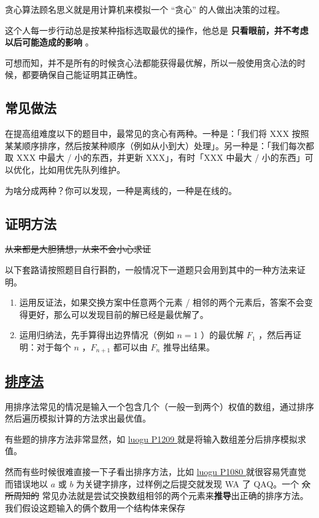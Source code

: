 
贪心算法顾名思义就是用计算机来模拟一个 “贪心” 的人做出决策的过程。

这个人每一步行动总是按某种指标选取最优的操作，他总是 \textbf{ 只看眼前，并不考虑以后可能造成的影响 } 。

可想而知，并不是所有的时候贪心法都能获得最优解，所以一般使用贪心法的时候，都要确保自己能证明其正确性。

\subsection{常见做法}

在提高组难度以下的题目中，最常见的贪心有两种。一种是：「我们将 XXX 按照某某顺序排序，然后按某种顺序（例如从小到大）处理」。另一种是：「我们每次都取 XXX 中最大 / 小的东西，并更新 XXX」，有时「XXX 中最大 / 小的东西」可以优化，比如用优先队列维护。

为啥分成两种？你可以发现，一种是离线的，一种是在线的。

\subsection{证明方法}

\sout{从来都是大胆猜想，从来不会小心求证}

以下套路请按照题目自行斟酌，一般情况下一道题只会用到其中的一种方法来证明。

\begin{enumerate}
\item 运用反证法，如果交换方案中任意两个元素 / 相邻的两个元素后，答案不会变得更好，那么可以发现目前的解已经是最优解了。
\item 运用归纳法，先手算得出边界情况（例如 $n = 1$ ）的最优解 $F_1$ ，然后再证明：对于每个 $n$ ，$F_{n+1}$ 都可以由 $F_{n}$ 推导出结果。
\end{enumerate}

\subsection{\href{https://goldimax.github.io/atricle.html?5b82a0a49f54540031c06bd8}{排序法}}

用排序法常见的情况是输入一个包含几个（一般一到两个）权值的数组，通过排序然后遍历模拟计算的方法求出最优值。

有些题的排序方法非常显然，如 \href{https://www.luogu.org/problemnew/show/P1209}{ luogu P1209 } 就是将输入数组差分后排序模拟求值。

然而有些时候很难直接一下子看出排序方法，比如 \href{https://www.luogu.org/problemnew/show/P1080}{ luogu P1080 } 就很容易凭直觉而错误地以 $a$ 或 $b$ 为关键字排序，过样例之后提交就发现 WA 了 QAQ。一个 \sout{众所周知的} 常见办法就是尝试交换数组相邻的两个元素来\textbf{推导}出正确的排序方法。我们假设这题输入的俩个数用一个结构体来保存

